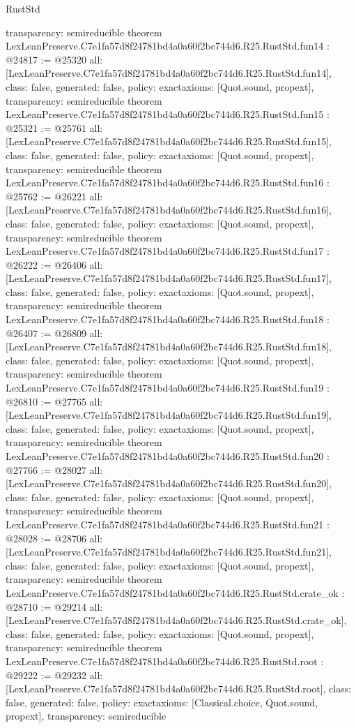 \begin{lexlean}{RustStd}
\begin{coremodule}
{  transparency: semireducible
}
theorem LexLeanPreserve.C7e1fa57d8f24781bd4a0a60f2bc744d6.R25.RustStd.fun14 : @24817 := @25320 {
  all: [LexLeanPreserve.C7e1fa57d8f24781bd4a0a60f2bc744d6.R25.RustStd.fun14],
  class: false,
  generated: false,
  policy: exact{axioms: [Quot.sound, propext]},
  transparency: semireducible
}
theorem LexLeanPreserve.C7e1fa57d8f24781bd4a0a60f2bc744d6.R25.RustStd.fun15 : @25321 := @25761 {
  all: [LexLeanPreserve.C7e1fa57d8f24781bd4a0a60f2bc744d6.R25.RustStd.fun15],
  class: false,
  generated: false,
  policy: exact{axioms: [Quot.sound, propext]},
  transparency: semireducible
}
theorem LexLeanPreserve.C7e1fa57d8f24781bd4a0a60f2bc744d6.R25.RustStd.fun16 : @25762 := @26221 {
  all: [LexLeanPreserve.C7e1fa57d8f24781bd4a0a60f2bc744d6.R25.RustStd.fun16],
  class: false,
  generated: false,
  policy: exact{axioms: [Quot.sound, propext]},
  transparency: semireducible
}
theorem LexLeanPreserve.C7e1fa57d8f24781bd4a0a60f2bc744d6.R25.RustStd.fun17 : @26222 := @26406 {
  all: [LexLeanPreserve.C7e1fa57d8f24781bd4a0a60f2bc744d6.R25.RustStd.fun17],
  class: false,
  generated: false,
  policy: exact{axioms: [Quot.sound, propext]},
  transparency: semireducible
}
theorem LexLeanPreserve.C7e1fa57d8f24781bd4a0a60f2bc744d6.R25.RustStd.fun18 : @26407 := @26809 {
  all: [LexLeanPreserve.C7e1fa57d8f24781bd4a0a60f2bc744d6.R25.RustStd.fun18],
  class: false,
  generated: false,
  policy: exact{axioms: [Quot.sound, propext]},
  transparency: semireducible
}
theorem LexLeanPreserve.C7e1fa57d8f24781bd4a0a60f2bc744d6.R25.RustStd.fun19 : @26810 := @27765 {
  all: [LexLeanPreserve.C7e1fa57d8f24781bd4a0a60f2bc744d6.R25.RustStd.fun19],
  class: false,
  generated: false,
  policy: exact{axioms: [Quot.sound, propext]},
  transparency: semireducible
}
theorem LexLeanPreserve.C7e1fa57d8f24781bd4a0a60f2bc744d6.R25.RustStd.fun20 : @27766 := @28027 {
  all: [LexLeanPreserve.C7e1fa57d8f24781bd4a0a60f2bc744d6.R25.RustStd.fun20],
  class: false,
  generated: false,
  policy: exact{axioms: [Quot.sound, propext]},
  transparency: semireducible
}
theorem LexLeanPreserve.C7e1fa57d8f24781bd4a0a60f2bc744d6.R25.RustStd.fun21 : @28028 := @28706 {
  all: [LexLeanPreserve.C7e1fa57d8f24781bd4a0a60f2bc744d6.R25.RustStd.fun21],
  class: false,
  generated: false,
  policy: exact{axioms: [Quot.sound, propext]},
  transparency: semireducible
}
theorem LexLeanPreserve.C7e1fa57d8f24781bd4a0a60f2bc744d6.R25.RustStd.crate_ok : @28710 := @29214 {
  all: [LexLeanPreserve.C7e1fa57d8f24781bd4a0a60f2bc744d6.R25.RustStd.crate_ok],
  class: false,
  generated: false,
  policy: exact{axioms: [Quot.sound, propext]},
  transparency: semireducible
}
theorem LexLeanPreserve.C7e1fa57d8f24781bd4a0a60f2bc744d6.R25.RustStd.root : @29222 := @29232 {
  all: [LexLeanPreserve.C7e1fa57d8f24781bd4a0a60f2bc744d6.R25.RustStd.root],
  class: false,
  generated: false,
  policy: exact{axioms: [Classical.choice, Quot.sound, propext]},
  transparency: semireducible
}


\end{coremodule}
\end{lexlean}
